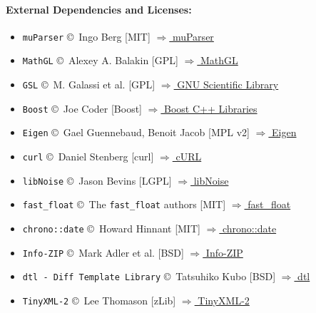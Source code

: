 \documentclass[DIV=17, parskip=half]{scrreprt}
\begin{document}
		\paragraph{External Dependencies and Licenses:}
		\begin{itemize}
			\item \verb!muParser! \copyright\ Ingo Berg [MIT]
			\href{https://beltoforion.de/en/muparser/}{$\Rightarrow$ muParser}

			\item \verb!MathGL! \copyright\ Alexey A. Balakin [GPL]
			\href{https://mathgl.sourceforge.net/}{$\Rightarrow$ MathGL}

			\item \verb!GSL! \copyright\ M. Galassi et al. [GPL]
			\href{https://www.gnu.org/software/gsl/}{$\Rightarrow$ GNU Scientific Library}

			\item \verb!Boost! \copyright\ Joe Coder [Boost]
			\href{https://www.boost.org/}{$\Rightarrow$ Boost C++ Libraries}

			\item \verb!Eigen! \copyright\ Gael Guennebaud, Benoit Jacob [MPL v2]
			\href{https://eigen.tuxfamily.org/}{$\Rightarrow$ Eigen}

			\item \verb!curl! \copyright\ Daniel Stenberg [curl]
			\href{https://curl.se/libcurl/}{$\Rightarrow$ cURL}

			\item \verb!libNoise! \copyright\ Jason Bevins [LGPL]
			\href{https://libnoise.sourceforge.net/}{$\Rightarrow$ libNoise}

			\item \verb!fast_float! \copyright\ The \verb!fast_float! authors [MIT]
			\href{https://github.com/fastfloat/fast_float}{$\Rightarrow$ fast\_float}

			\item \verb!chrono::date! \copyright\ Howard Hinnant [MIT]
			\href{https://github.com/HowardHinnant/date}{$\Rightarrow$ chrono::date}

			\item \verb!Info-ZIP! \copyright\ Mark Adler et al. [BSD]
			\href{https://infozip.sourceforge.net/}{$\Rightarrow$ Info-ZIP}

			\item \verb!dtl - Diff Template Library! \copyright\ Tatsuhiko Kubo [BSD]
			\href{https://github.com/cubicdaiya/dtl}{$\Rightarrow$ dtl}

			\item \verb!TinyXML-2! \copyright\ Lee Thomason [zLib]
			\href{https://github.com/leethomason/tinyxml2}{$\Rightarrow$ TinyXML-2}


\end{itemize}
\end{document}

